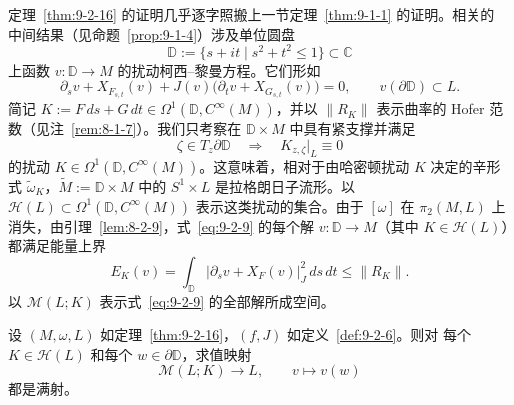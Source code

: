 定理~\ref{thm:9-2-16} 的证明几乎逐字照搬上一节定理~\ref{thm:9-1-1} 的证明。相关的
中间结果（见命题~\ref{prop:9-1-4}）涉及单位圆盘
\[
  \mathbb D:=\{s+it\mid s^2+t^2\le1\}\subset\mathbb C
\]
上函数 $v:\mathbb D\to M$ 的扰动柯西--黎曼方程。它们形如
\begin{equation}\label{eq:9-2-9}
  \partial_sv+X_{F_{s,t}}(v)
  +J(v)\bigl(\partial_tv+X_{G_{s,t}}(v)\bigr)=0,
  \qquad v(\partial\mathbb D)\subset L.
\end{equation}
简记
$K:=F\,ds+G\,dt\in\Omega^1(\mathbb D,C^\infty(M))$，并以
$\|R_K\|$ 表示曲率的 Hofer 范数（见注~\ref{rem:8-1-7}）。我们只考察在
$\mathbb D\times M$ 中具有紧支撑并满足
\[
  \zeta\in T_z\partial\mathbb D
  \quad\Longrightarrow\quad K_{z,\zeta}|_L\equiv0
\]
的扰动 $K\in\Omega^1(\mathbb D,C^\infty(M))$。这意味着，相对于由哈密顿扰动
$K$ 决定的辛形式 $\widetilde\omega_K$，$\widetilde M:=\mathbb D\times M$ 中的
$S^1\times L$ 是拉格朗日子流形。以
$\mathcal H(L)\subset\Omega^1(\mathbb D,C^\infty(M))$ 表示这类扰动的集合。由于
$[\omega]$ 在 $\pi_2(M,L)$ 上消失，由引理~\ref{lem:8-2-9}，式~\eqref{eq:9-2-9}
的每个解 $v:\mathbb D\to M$（其中 $K\in\mathcal H(L)$）都满足能量上界
\[
  E_K(v)=\int_{\mathbb D}|\partial_sv+X_F(v)|_J^2\,ds\,dt
  \le\|R_K\|.
\]
以 $\mathcal M(L;K)$ 表示式~\eqref{eq:9-2-9} 的全部解所成空间。

\begin{proposition}\label{prop:9-2-18}
设 $(M,\omega,L)$ 如定理~\ref{thm:9-2-16}，$(f,J)$ 如定义~\ref{def:9-2-6}。则对
每个 $K\in\mathcal H(L)$ 和每个 $w\in\partial\mathbb D$，求值映射
\[
  \mathcal M(L;K)\longrightarrow L,
  \qquad v\longmapsto v(w)
\]
都是满射。
\end{proposition}


